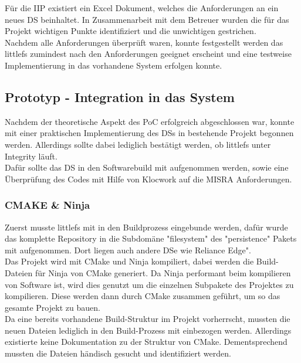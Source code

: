 Für die IIP existiert ein Excel Dokument, welches die Anforderungen an ein neues \acl{DS} beinhaltet.
In Zusammenarbeit mit dem Betreuer wurden die für das Projekt wichtigen Punkte identifiziert und die unwichtigen gestrichen.\\


Nachdem alle Anforderungen überprüft waren, konnte festgestellt werden das littlefs zumindest nach den Anforderungen
geeignet erscheint und eine testweise Implementierung in das vorhandene System erfolgen konnte.


\subsection{Prototyp - Integration in das System}
\label{section:prototyp_integration}
Nachdem der theoretische Aspekt des \acl{PoC} erfolgreich abgeschlossen war,
konnte mit einer praktischen Implementierung des \acl{DS}s in bestehende Projekt begonnen werden.
Allerdings sollte dabei lediglich bestätigt werden, ob littlefs unter Integrity läuft.\\

Dafür sollte das \acl{DS} in den Softwarebuild mit aufgenommen werden,
sowie eine Überprüfung des Codes mit Hilfe von Klocwork auf die MISRA Anforderungen.\\


\subsubsection{CMAKE \& Ninja}
Zuerst musste littlefs mit in den Buildprozess eingebunde werden,
dafür wurde das komplette Repository in die Subdomäne "filesystem" des "persistence" Pakets mit aufgenommen.
Dort liegen auch andere \acl{DS}e wie Reliance Edge".\\

Das Projekt wird mit CMake und Ninja kompiliert, dabei werden die Build-Dateien für Ninja von CMake generiert.
Da Ninja performant beim kompilieren von Software ist, wird dies genutzt um die einzelnen Subpakete des Projektes zu kompilieren.
Diese werden dann durch CMake zusammen geführt, um so das gesamte Projekt zu bauen.\\

Da eine bereits vorhandene Build-Struktur im Projekt vorherrscht, mussten die neuen Dateien lediglich in den Build-Prozess mit einbezogen werden.
Allerdings existierte keine Dokumentation zu der Struktur von CMake. Dementsprechend mussten die Dateien händisch gesucht und identifiziert werden.

